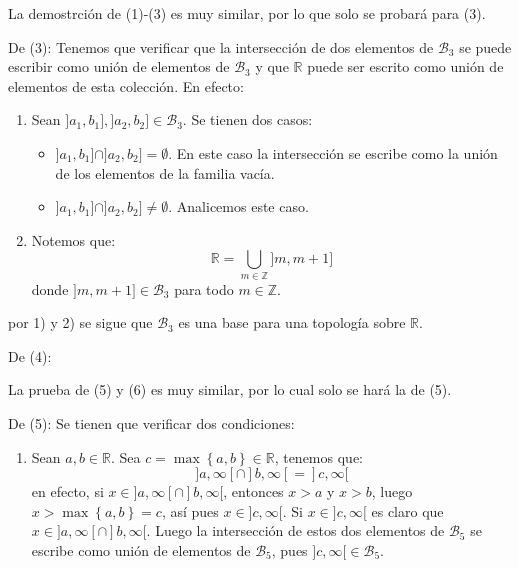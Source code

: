 \documentclass[12pt]{report}
\theoremstyle{largebreak}
\begin{document}
    \begin{sol}

        La demostrción de (1)-(3) es muy similar, por lo que solo se probará para (3).
        
        De (3): Tenemos que verificar que la intersección de dos elementos de $\mathcal{B}_3$ se puede escribir como unión de elementos de $\mathcal{B}_3$ y que $\mathbb{R}$ puede ser escrito como unión de elementos de esta colección. En efecto:
        \begin{enumerate}
            \item Sean $]a_1,b_1],]a_2,b_2]\in\mathcal{B}_3$. Se tienen dos casos:
            \begin{itemize}
                \item $]a_1,b_1]\cap]a_2,b_2]=\emptyset$. En este caso la intersección se escribe como la unión de los elementos de la familia vacía.
                \item $]a_1,b_1]\cap]a_2,b_2]\neq \emptyset$. Analicemos este caso.
            \end{itemize}
            \item Notemos que:
            \begin{equation*}
                \mathbb{R}=\bigcup_{m\in\mathbb{Z} }]m,m+1]
            \end{equation*}
            donde $]m,m+1]\in\mathcal{B}_3$ para todo $m\in\mathbb{Z}$.
        \end{enumerate}
        por 1) y 2) se sigue que $\mathcal{B}_3$ es una base para una topología sobre $\mathbb{R}$.

        De (4): 

        La prueba de (5) y (6) es muy similar, por lo cual solo se hará la de (5).
        
        De (5): Se tienen que verificar dos condiciones:
        \begin{enumerate}
            \item Sean $a,b\in\mathbb{R}$. Sea $c=\max\left\{a,b\right\}\in\mathbb{R}$, tenemos que:
            \begin{equation*}
                ]a,\infty[\cap]b,\infty[=]c,\infty[
            \end{equation*}
            en efecto, si $x\in ]a,\infty[\cap]b,\infty[$, entonces $x>a$ y $x>b$, luego $x>\max\left\{a,b\right\}=c$, así pues $x\in ]c,\infty[$. Si $x\in]c,\infty[$ es claro que $x\in]a,\infty[\cap]b,\infty[$. Luego la intersección de estos dos elementos de $\mathcal{B}_5$ se escribe como unión de elementos de $\mathcal{B}_5$, pues $]c,\infty[\in\mathcal{B}_5$.


\end{enumerate}
\end{sol}
\end{document}
